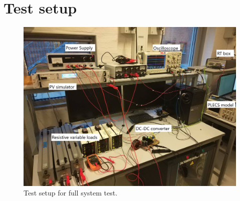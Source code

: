 \chapter{Test setup}

\begin{figure}[H]
	\begin{center}
		\includegraphics[width=1\textwidth]{../Pictures/P1/Appendix/testsetup.png}
		\caption{Test setup for full system test.}
		\label{testsetup}
	\end{center}	
\end{figure}